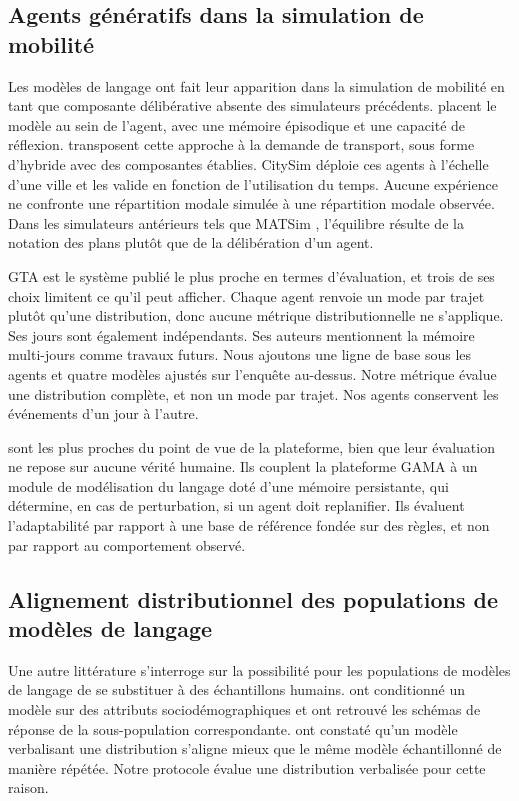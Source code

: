 \subsection{Agents génératifs dans la simulation de mobilité}
\label{sec:generative-mobility}

Les modèles de langage ont fait leur apparition dans la simulation de mobilité en tant que composante délibérative absente des simulateurs précédents. \citet{park2023generative} placent le modèle au sein de l'agent, avec une mémoire épisodique et une capacité de réflexion. \citet{liu2024toward} transposent cette approche à la demande de transport, sous forme d'hybride avec des composantes établies. CitySim \citep{bougie2025citysim} déploie ces agents à l'échelle d'une ville et les valide en fonction de l'utilisation du temps. Aucune expérience ne confronte une répartition modale simulée à une répartition modale observée. Dans les simulateurs antérieurs tels que MATSim \citep{horni2016matsim}, l'équilibre résulte de la notation des plans plutôt que de la délibération d'un agent.

GTA \citep{lammer2026gta} est le système publié le plus proche en termes d'évaluation, et trois de ses choix limitent ce qu'il peut afficher. Chaque agent renvoie un mode par trajet plutôt qu'une distribution, donc aucune métrique distributionnelle ne s'applique. Ses jours sont également indépendants. Ses auteurs mentionnent la mémoire multi-jours comme travaux futurs. Nous ajoutons une ligne de base sous les agents et quatre modèles ajustés sur l'enquête au-dessus. Notre métrique évalue une distribution complète, et non un mode par trajet. Nos agents conservent les événements d'un jour à l'autre.

\citet{alves2026evaluating} sont les plus proches du point de vue de la plateforme, bien que leur évaluation ne repose sur aucune vérité humaine. Ils couplent la plateforme GAMA à un module de modélisation du langage doté d'une mémoire persistante, qui détermine, en cas de perturbation, si un agent doit replanifier. Ils évaluent l'adaptabilité par rapport à une base de référence fondée sur des règles, et non par rapport au comportement observé.

\subsection{Alignement distributionnel des populations de modèles de langage}
\label{sec:alignment}

Une autre littérature s'interroge sur la possibilité pour les populations de modèles de langage de se substituer à des échantillons humains. \citet{argyle2023outofone} ont conditionné un modèle sur des attributs sociodémographiques et ont retrouvé les schémas de réponse de la sous-population correspondante. \citet{meister2024benchmarking} ont constaté qu'un modèle verbalisant une distribution s'aligne mieux que le même modèle échantillonné de manière répétée. Notre protocole évalue une distribution verbalisée pour cette raison.

